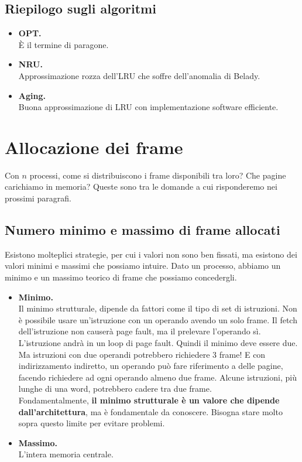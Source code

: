 \documentclass{report}
\begin{document}
\subsection{Riepilogo sugli algoritmi}
\begin{itemize}
    \item \textbf{OPT.}\\
    È il termine di paragone.
    
    \item \textbf{NRU.}\\
    Approssimazione rozza dell'LRU che soffre dell'anomalia di Belady.

    \item \textbf{Aging.}\\ 
    Buona approssimazione di LRU con implementazione
software efficiente.
\end{itemize}

\newpage

\section{Allocazione dei frame}

Con $n$ processi, come si distribuiscono i frame disponibili tra loro? Che pagine carichiamo in memoria? Queste sono tra le domande a cui risponderemo nei prossimi paragrafi.

\subsection{Numero minimo e massimo di frame allocati}
Esistono molteplici strategie, per cui i valori non sono ben fissati, ma esistono dei valori minimi e massimi che possiamo intuire.
Dato un processo, abbiamo un minimo e un massimo teorico di frame che possiamo concedergli.
\begin{itemize}
    \item \textbf{Minimo.}\\
    Il minimo strutturale, dipende da fattori come il tipo di set di istruzioni.
    Non è possibile usare un'istruzione con un operando avendo un solo frame. Il fetch dell'istruzione non causerà page fault, ma il prelevare l'operando sì. L'istruzione andrà in un loop di page fault. Quindi il minimo deve essere due. Ma istruzioni con due operandi potrebbero richiedere 3 frame! E con indirizzamento indiretto, un operando può fare riferimento a delle pagine, facendo richiedere ad ogni operando almeno due frame. Alcune istruzioni, più lunghe di una word, potrebbero cadere tra due frame. \\
    Fondamentalmente, \textbf{il minimo strutturale è un valore che dipende dall'architettura}, ma è fondamentale da conoscere. Bisogna stare molto sopra questo limite per evitare problemi.
    \item \textbf{Massimo.}\\
    L'intera memoria centrale.
\end{itemize}
\end{document}
